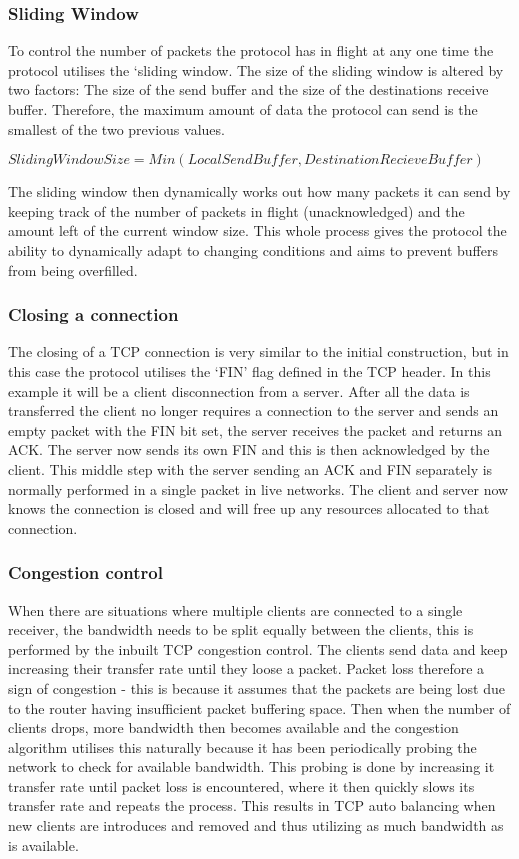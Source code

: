 \subsubsection*{Sliding Window}
To control the number of packets the protocol has in flight at any one time the protocol utilises the `sliding window. The size of the sliding window is altered by two factors: The size of the send buffer and the size of the destinations receive buffer. Therefore, the maximum amount of data the protocol can send is the smallest of the two previous values. 
\begin{center}
	$SlidingWindowSize = Min(LocalSendBuffer, DestinationRecieveBuffer)$
\end{center}
The sliding window then dynamically works out how many packets it can send by keeping track of the number of packets in flight (unacknowledged) and the amount left of the current window size. This whole process gives the protocol the ability to dynamically adapt to changing conditions and aims to prevent buffers from being overfilled.


\subsubsection*{Closing a connection}
The closing of a TCP connection is very similar to the initial construction, but in this case the protocol utilises the `FIN' flag defined in the TCP header. In this example it will be a client disconnection from a server. After all the data is transferred the client no longer requires a connection to the server and sends an empty packet with the FIN bit set, the server receives the packet and returns an ACK. The server now sends its own FIN and this is then acknowledged by the client. This middle step with the server sending an ACK and FIN separately is normally performed in a single packet in live networks. The client and server now knows the connection is closed and will free up any resources allocated to that connection.



\subsubsection*{Congestion control}
When there are situations where multiple clients are connected to a single receiver, the bandwidth needs to be split equally between the clients, this is performed by the inbuilt TCP congestion control. The clients send data and keep increasing their transfer rate until they loose a packet. Packet loss therefore a sign of congestion - this is because it assumes that the packets are being lost due to the router having insufficient packet buffering space. Then when the number of clients drops, more bandwidth then becomes available and the congestion algorithm utilises this naturally because it has been periodically probing the network to check for available bandwidth. This probing is done by increasing it transfer rate until packet loss is encountered, where it then quickly slows its transfer rate and repeats the process. This results in TCP auto balancing when new clients are introduces and removed and thus utilizing as much bandwidth as is available.

